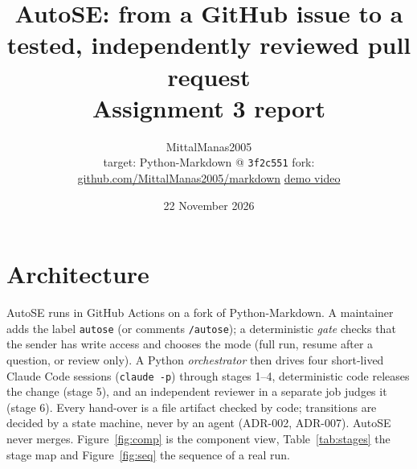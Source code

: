 \documentclass[10pt,a4paper]{article}
\title{\vspace{-1.4cm}\textbf{AutoSE: from a GitHub issue to a tested, independently reviewed pull request}\\[2pt]
\large Assignment 3 report}
\author{MittalManas2005\\[1pt]\small target: Python-Markdown @ \texttt{3f2c551} \quad\textbullet\quad fork: \href{https://github.com/MittalManas2005/markdown}{github.com/MittalManas2005/markdown} \quad\textbullet\quad \href{https://iiithydresearch-my.sharepoint.com/:f:/g/personal/manas_mittal_research_iiit_ac_in/IgBBBr3TTEn4Q4LBgxDO9E7wAZs1QewfuO216DN1abJWD9Y?e=9FMSfE}{demo video}}
\date{22 November 2026}
\newcommand{\adr}[1]{ADR-#1}
\begin{document}
\maketitle

\section{Architecture}
AutoSE runs in GitHub Actions on a fork of Python-Markdown. A maintainer adds the label \texttt{autose} (or comments
\texttt{/autose}); a deterministic \emph{gate} checks that the sender has write access and chooses the mode (full run,
resume after a question, or review only). A Python \emph{orchestrator} then drives four short-lived Claude Code sessions
(\texttt{claude -p}) through stages 1--4, deterministic code releases the change (stage 5), and an independent reviewer
in a separate job judges it (stage 6). Every hand-over is a file artifact checked by code; transitions are decided by a
state machine, never by an agent (\adr{002}, \adr{007}). AutoSE never merges. Figure~\ref{fig:comp} is the component view,
Table~\ref{tab:stages} the stage map and Figure~\ref{fig:seq} the sequence of a real run.
\end{document}
